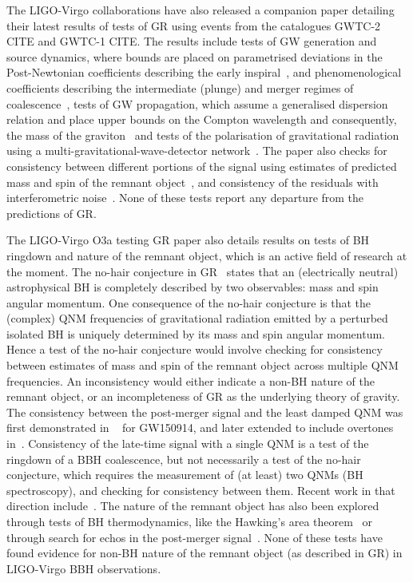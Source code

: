 \documentclass[twocolumn,prd,superscriptaddress,amsfonts,amssymb,amsmath,preprintnumbers]{revtex4-1}
\begin{document}
The LIGO-Virgo collaborations have also released a companion paper detailing their latest results of tests of GR using events from the catalogues GWTC-2 CITE and GWTC-1 CITE. The results include tests of GW generation and source dynamics, where bounds are placed on parametrised deviations in the Post-Newtonian coefficients describing the early inspiral~\citep{earlydevelopmentpapers}, and phenomenological coefficients describing the intermediate (plunge) and merger regimes of coalescence~\citep{TIGERmethodspapers}, tests of GW propagation, which assume a generalised dispersion relation and place upper bounds on the Compton wavelength and consequently, the mass of the graviton~\citep{gw170104,samajdar2017projected} and tests of the polarisation of gravitational radiation using a multi-gravitational-wave-detector network~\citep{gw170814,isi2017probing}. The paper also checks for consistency between different portions of the signal using estimates of predicted mass and spin of the remnant object~\citep{Ghosh:2016xx,Ghosh:2017gfp,LSC_2016grtests}, and consistency of the residuals with interferometric noise~\citep{Ghonge:2020suv,gwtc1_tgr}. None of these tests report any departure from the predictions of GR.
\par
The LIGO-Virgo O3a testing GR paper also details results on tests of BH ringdown and nature of the remnant object, which is an active field of research at the moment. The no-hair conjecture in GR~\citep{} states that an (electrically neutral) astrophysical BH is completely described by two observables: mass and spin angular momentum. One consequence of the no-hair conjecture is that the (complex) QNM frequencies of gravitational radiation emitted by a perturbed isolated BH is uniquely determined by its mass and spin angular momentum. Hence a test of the no-hair conjecture would involve checking for consistency between estimates of mass and spin of the remnant object across multiple QNM frequencies. An inconsistency would either indicate a non-BH nature of the remnant object, or an incompleteness of GR as the underlying theory of gravity. The consistency between the post-merger signal and the least damped QNM was first demonstrated in ~\citep{LSC_2016grtests} for GW150914, and later extended to include overtones in~\citep{Brito:2018rfr,Giesler:2019uxc,Isi:2019aib,Bhagwat:2019dtm,Forteza:2020hbw}. Consistency of the late-time signal with a single QNM is a test of the ringdown of a BBH coalescence, but not necessarily a test of the no-hair conjecture, which requires the measurement of (at least) two QNMs (BH spectroscopy), and checking for consistency between them. Recent work in that direction include~\citep{Carullo:2018gah,Carullo:2019flw,Bhagwat:2019bwv}. The nature of the remnant object has also been explored through tests of BH thermodynamics, like the Hawking's area theorem~\citep{Cabero:2017avf} or through search for echos in the post-merger signal~\citep{Nielsen:2018lkf,Tsang:2019zra,Lo:2018sep,Abedi:2018npz,Abedi:2020sgg,Testa:2018bzd}. None of these tests have found evidence for non-BH nature of the remnant object (as described in GR) in LIGO-Virgo BBH observations.
\end{document}
